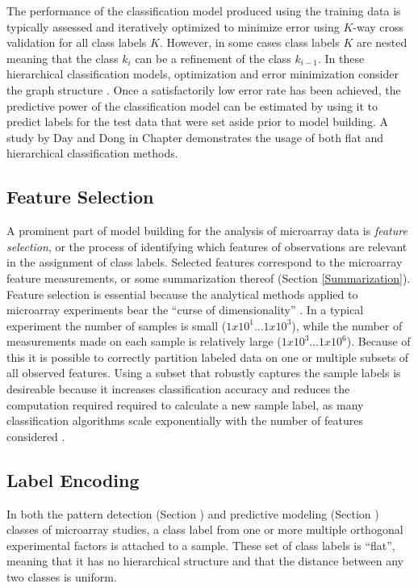 The performance of the classification model produced using the training data is
typically assessed and iteratively optimized to minimize error using $K$-way
cross validation for all class labels $K$.  However, in some cases class labels
$K$ are nested meaning that the class $k_{i}$ can be a refinement of the
class $k_{i-1}$.  In these hierarchical classification models, optimization and
error minimization consider the graph structure \cite{pachinko}.  Once a
satisfactorily low error rate has been achieved, the predictive power of the
classification model can be estimated by using it to predict labels for the
test data that were set aside prior to model building.  A study by Day and Dong
in Chapter \classchapter demonstrates the usage of both flat and hierarchical
classification methods.

\subsection{Feature Selection}
\label{Feature Selection}

A prominent part of model building for the analysis of microarray data is
\emph{feature selection}, or the process of identifying which features of
observations are relevant in the assignment of class labels.  Selected
features correspond to the microarray feature measurements, or some
summarization thereof (Section \ref{Summarization}).  Feature selection is
essential because the analytical methods applied to microarray experiments bear
the ``curse of dimensionality'' \cite{Bellman_1957}.  In a typical experiment
the number of samples is small ($1x10^1 \dots 1x10^3$), while the number of
measurements made on each sample is relatively large ($1x10^3 \dots 1x10^6$).
Because of this it is possible to correctly partition labeled data on one or
multiple subsets of all observed features.  Using a subset that robustly
captures the sample labels is desireable because it increases classification
accuracy and reduces the computation required required to calculate a new
sample label, as many classification algorithms scale exponentially with the
number of features considered \cite{john94irrelevant}.

\subsection{Label Encoding}
\label{Label Encoding}

In both the pattern detection (Section \label{Pattern Detection}) and
predictive modeling (Section \label{Predictive Modeling}) classes of microarray
studies, a class label from one or more multiple orthogonal experimental
factors is attached to a sample.  These set of class labels is ``flat'',
meaning that it has no hierarchical structure and that the distance between any
two classes is uniform.  


